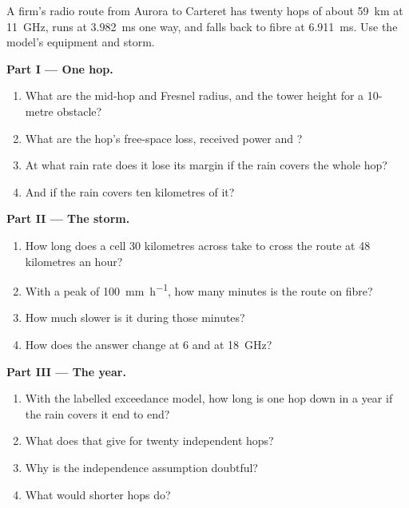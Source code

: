 \begin{problem}\label{pb:nw:long-haul-wireless:1}
A firm's radio route from Aurora to Carteret has twenty hops of about \qty{59}{\kilo\metre} at \qty{11}{\giga\hertz}, runs at \qty{3.982}{\milli\second}
one way, and falls back to fibre at \qty{6.911}{\milli\second}. Use the model's equipment and storm.

\medskip\noindent\textbf{Part I --- One hop.}
\begin{enumerate}
\item What are the mid-hop  and Fresnel radius, and the tower height for a 10-metre obstacle?
\item What are the hop's free-space loss, received power and ?
\item At what rain rate does it lose its margin if the rain covers the whole hop?
\item And if the rain covers ten kilometres of it?
\end{enumerate}

\medskip\noindent\textbf{Part II --- The storm.}
\begin{enumerate}[resume]
\item How long does a cell 30 kilometres across take to cross the route at 48 kilometres an hour?
\item With a peak of \qty{100}{\milli\metre\per\hour}, how many minutes is the route on fibre?
\item How much slower is it during those minutes?
\item How does the answer change at 6 and at \qty{18}{\giga\hertz}?
\end{enumerate}

\medskip\noindent\textbf{Part III --- The year.}
\begin{enumerate}[resume]
\item With the labelled exceedance model, how long is one hop down in a year if the rain covers it end to end?
\item What does that give for twenty independent hops?
\item Why is the independence assumption doubtful?
\item What would shorter hops do?
\end{enumerate}


\end{problem}
